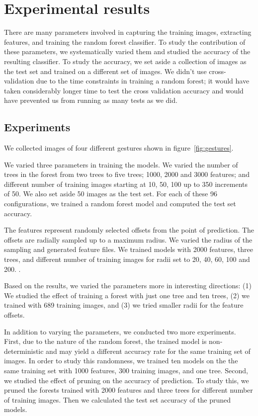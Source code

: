 \section{Experimental results}
There are many parameters involved in capturing the training images, extracting features, and training the random forest classifier. To study the contribution of these parameters, we systematically varied them and studied the accuracy of the resulting classifier. To study the accuracy, we set aside a collection of images as the test set and trained on a different set of images. We didn't use cross-validation due to the time constraints in training a random forest; it would have taken considerably longer time to test the cross validation accuracy and would  have prevented us from running as many tests as we did.

\subsection{Experiments}
We collected images of four different gestures shown in figure~\ref{fig:gestures}.

We varied three parameters in training the models. We varied the number of trees in the forest from two trees to five trees; 1000, 2000 and 3000 features; and different number of training images starting at 10, 50, 100 up to 350 increments of 50. We also set aside 50 images as the test set. For each of these 96 configurations, we trained a random forest model and computed the test set accuracy.

The features represent randomly selected offsets from the point of prediction. The offsets are radially sampled up to a maximum radius. We varied the radius of the sampling and generated feature files. We trained models with 2000 features, three trees, and different number of training images for radii set to 20, 40, 60, 100 and 200. .

Based on the results, we varied the parameters more in interesting directions: (1) We studied the effect of training a forest with just one tree and ten trees, (2) we trained with 689 training images, and (3) we tried smaller radii for the feature offsets. 

In addition to varying the parameters, we conducted two more experiments. First, due to the nature of the random forest, the trained model is non-deterministic and may yield a different accuracy rate for the same training set of images. In order to study this randomness, we trained ten models on the the same training set with 1000 features, 300 training images, and one tree. Second, we studied the effect of pruning on the accuracy of prediction. To study this, we pruned the forests trained with 2000 features and three trees for different number of training images. Then we calculated the test set accuracy of the pruned models.

